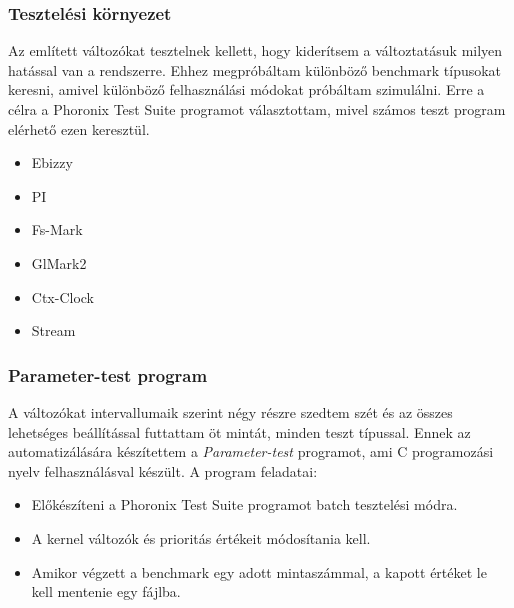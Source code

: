 \documentclass{beamer}
\begin{document}
\begin{frame}
\frametitle{Tesztelési környezet}
Az említett változókat tesztelnek kellett, hogy kiderítsem a változtatásuk milyen hatással van a rendszerre.
Ehhez megpróbáltam különböző benchmark típusokat keresni, amivel különböző felhasználási módokat próbáltam szimulálni.
Erre a célra a Phoronix Test Suite programot választottam, mivel számos teszt program elérhető ezen keresztül.
\begin{itemize}
	\item Ebizzy
	\item PI
	\item Fs-Mark
	\item GlMark2
	\item Ctx-Clock
	\item Stream
\end{itemize}
\end{frame}

\begin{frame}
\frametitle{Parameter-test program}
A változókat intervallumaik szerint négy részre szedtem szét és az összes lehetséges beállítással futtattam öt mintát, minden teszt típussal.
Ennek az automatizálására készítettem a \textit{Parameter-test} programot, ami C programozási nyelv felhasználásval készült. 
A program feladatai:
\begin{itemize}
\item Előkészíteni a Phoronix Test Suite programot batch tesztelési módra.
\item A kernel változók és prioritás értékeit módosítania kell.
\item Amikor végzett a benchmark egy adott mintaszámmal, a kapott értéket le kell mentenie egy fájlba.
\end{itemize}
\end{frame}
\end{document}
